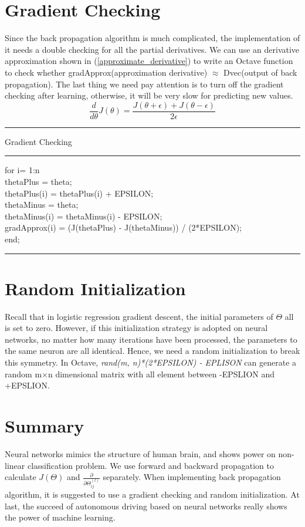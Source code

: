 \documentclass{article}
\begin{document}
\section{Gradient Checking}
Since the back propagation algorithm is much complicated, the implementation of it needs a double checking for all the partial derivatives. We can use an derivative approximation shown in (\ref{approximate_derivative}) to write an Octave function to check whether gradApprox(approximation derivative) $\approx$ Dvec(output of back propagation). The last thing we need pay attention is to turn off the gradient checking after learning, otherwise, it will be very slow for predicting new values.
\begin{equation}\label{approximate_derivative}
\frac{d}{d\theta}J(\theta) = \frac{J(\theta + \epsilon) + J(\theta - \epsilon)}{2 \epsilon}
\end{equation}

\newpage
\smallskip
\hrule
\smallskip
Gradient Checking\\
\smallskip
\hrule
\smallskip
\noindent for i= 1:n\\
\indent thetaPlus = theta;\\
\indent thetaPlus(i) = thetaPlus(i) + EPSILON;\\
\indent thetaMinus = theta;\\
\indent thetaMinus(i) = thetaMinus(i) - EPSILON;\\
\indent gradApprox(i) = (J(thetaPlus) - J(thetaMinus)) / (2*EPSILON);\\
end;\\
\hrule
\medskip

\section{Random Initialization}
Recall that in logistic regression gradient descent, the initial parameters of $\Theta$ all is set to zero. However, if this initialization strategy is adopted on neural networks, no matter how many iterations have been processed, the parameters to the same neuron are all identical. Hence, we need a random initialization to break this symmetry. In Octave, \emph{rand(m, n)*(2*EPSILON) - EPLISON} can generate a random m$\times$n dimensional matrix with all element between -EPSLION and +EPSLION.

\section{Summary}
Neural networks mimics the structure of human brain, and shows power on non-linear classification problem. We use forward and backward propagation to calculate $J(\Theta)$ and $\frac{\partial}{\partial \Theta_{ij}^{(l)}}$ separately. When implementing back propagation algorithm, it is suggested to use a gradient checking and random initialization. At last, the succeed of autonomous driving based on neural networks really shows the power of machine learning.
\end{document}
